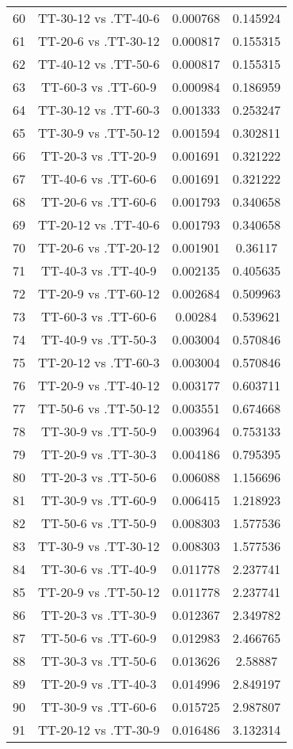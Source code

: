 \documentclass[a4paper,10pt]{article}
\begin{document}
\begin{landscape}
\begin{table}[!htp]
\begin{tabular}{cccc}
60&TT-30-12 vs .TT-40-6&0.000768&0.145924\\
61&TT-20-6 vs .TT-30-12&0.000817&0.155315\\
62&TT-40-12 vs .TT-50-6&0.000817&0.155315\\
63&TT-60-3 vs .TT-60-9&0.000984&0.186959\\
64&TT-30-12 vs .TT-60-3&0.001333&0.253247\\
65&TT-30-9 vs .TT-50-12&0.001594&0.302811\\
66&TT-20-3 vs .TT-20-9&0.001691&0.321222\\
67&TT-40-6 vs .TT-60-6&0.001691&0.321222\\
68&TT-20-6 vs .TT-60-6&0.001793&0.340658\\
69&TT-20-12 vs .TT-40-6&0.001793&0.340658\\
70&TT-20-6 vs .TT-20-12&0.001901&0.36117\\
71&TT-40-3 vs .TT-40-9&0.002135&0.405635\\
72&TT-20-9 vs .TT-60-12&0.002684&0.509963\\
73&TT-60-3 vs .TT-60-6&0.00284&0.539621\\
74&TT-40-9 vs .TT-50-3&0.003004&0.570846\\
75&TT-20-12 vs .TT-60-3&0.003004&0.570846\\
76&TT-20-9 vs .TT-40-12&0.003177&0.603711\\
77&TT-50-6 vs .TT-50-12&0.003551&0.674668\\
78&TT-30-9 vs .TT-50-9&0.003964&0.753133\\
79&TT-20-9 vs .TT-30-3&0.004186&0.795395\\
80&TT-20-3 vs .TT-50-6&0.006088&1.156696\\
81&TT-30-9 vs .TT-60-9&0.006415&1.218923\\
82&TT-50-6 vs .TT-50-9&0.008303&1.577536\\
83&TT-30-9 vs .TT-30-12&0.008303&1.577536\\
84&TT-30-6 vs .TT-40-9&0.011778&2.237741\\
85&TT-20-9 vs .TT-50-12&0.011778&2.237741\\
86&TT-20-3 vs .TT-30-9&0.012367&2.349782\\
87&TT-50-6 vs .TT-60-9&0.012983&2.466765\\
88&TT-30-3 vs .TT-50-6&0.013626&2.58887\\
89&TT-20-9 vs .TT-40-3&0.014996&2.849197\\
90&TT-30-9 vs .TT-60-6&0.015725&2.987807\\
91&TT-20-12 vs .TT-30-9&0.016486&3.132314\\

\end{tabular}
\end{table}
\end{landscape}
\end{document}
